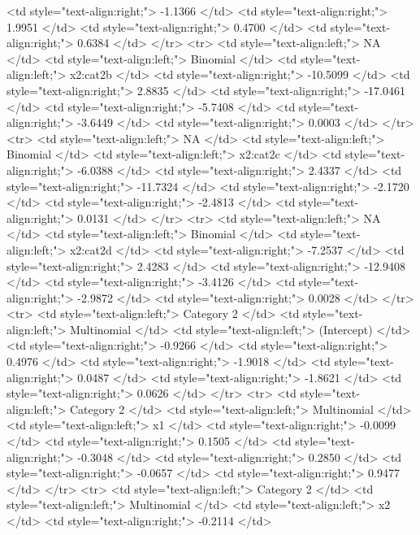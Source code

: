 \documentclass[a4paper]{article}
\begin{document}
\begin{HTML}
   <td style="text-align:right;"> -1.1366 </td>
   <td style="text-align:right;"> 1.9951 </td>
   <td style="text-align:right;"> 0.4700 </td>
   <td style="text-align:right;"> 0.6384 </td>
  </tr>
  <tr>
   <td style="text-align:left;"> NA </td>
   <td style="text-align:left;"> Binomial </td>
   <td style="text-align:left;"> x2:cat2b </td>
   <td style="text-align:right;"> -10.5099 </td>
   <td style="text-align:right;"> 2.8835 </td>
   <td style="text-align:right;"> -17.0461 </td>
   <td style="text-align:right;"> -5.7408 </td>
   <td style="text-align:right;"> -3.6449 </td>
   <td style="text-align:right;"> 0.0003 </td>
  </tr>
  <tr>
   <td style="text-align:left;"> NA </td>
   <td style="text-align:left;"> Binomial </td>
   <td style="text-align:left;"> x2:cat2c </td>
   <td style="text-align:right;"> -6.0388 </td>
   <td style="text-align:right;"> 2.4337 </td>
   <td style="text-align:right;"> -11.7324 </td>
   <td style="text-align:right;"> -2.1720 </td>
   <td style="text-align:right;"> -2.4813 </td>
   <td style="text-align:right;"> 0.0131 </td>
  </tr>
  <tr>
   <td style="text-align:left;"> NA </td>
   <td style="text-align:left;"> Binomial </td>
   <td style="text-align:left;"> x2:cat2d </td>
   <td style="text-align:right;"> -7.2537 </td>
   <td style="text-align:right;"> 2.4283 </td>
   <td style="text-align:right;"> -12.9408 </td>
   <td style="text-align:right;"> -3.4126 </td>
   <td style="text-align:right;"> -2.9872 </td>
   <td style="text-align:right;"> 0.0028 </td>
  </tr>
  <tr>
   <td style="text-align:left;"> Category 2 </td>
   <td style="text-align:left;"> Multinomial </td>
   <td style="text-align:left;"> (Intercept) </td>
   <td style="text-align:right;"> -0.9266 </td>
   <td style="text-align:right;"> 0.4976 </td>
   <td style="text-align:right;"> -1.9018 </td>
   <td style="text-align:right;"> 0.0487 </td>
   <td style="text-align:right;"> -1.8621 </td>
   <td style="text-align:right;"> 0.0626 </td>
  </tr>
  <tr>
   <td style="text-align:left;"> Category 2 </td>
   <td style="text-align:left;"> Multinomial </td>
   <td style="text-align:left;"> x1 </td>
   <td style="text-align:right;"> -0.0099 </td>
   <td style="text-align:right;"> 0.1505 </td>
   <td style="text-align:right;"> -0.3048 </td>
   <td style="text-align:right;"> 0.2850 </td>
   <td style="text-align:right;"> -0.0657 </td>
   <td style="text-align:right;"> 0.9477 </td>
  </tr>
  <tr>
   <td style="text-align:left;"> Category 2 </td>
   <td style="text-align:left;"> Multinomial </td>
   <td style="text-align:left;"> x2 </td>
   <td style="text-align:right;"> -0.2114 </td>

\end{HTML}
\end{document}
